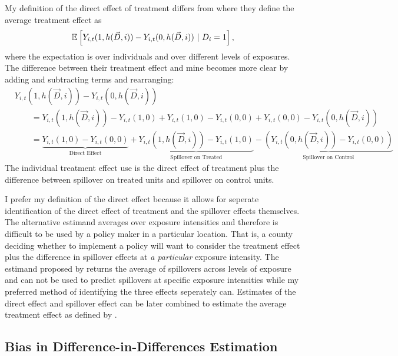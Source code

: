 \documentclass[11pt]{article}
\begin{document}
My definition of the direct effect of treatment differs from \citet{Sävje_Aronow_Hudgens_2019} where they define the average treatment effect as \[ 
    \mathbb{E}\left[Y_{i,t}(1, h(\vec{D}, i)) - Y_{i,t}(0, h(\vec{D}, i)) \ \vert \ D_i = 1\right],
\] 
where the expectation is over individuals and over different levels of exposures. The difference between their treatment effect and mine becomes more clear by adding and subtracting terms and rearranging:
\begin{align*}
    &Y_{i,t}(1, h(\vec{D}, i)) - Y_{i,t}(0, h(\vec{D}, i)) \\
    &\quad\quad = Y_{i,t}(1, h(\vec{D}, i)) - Y_{i,t}(1, 0) + Y_{i,t}(1, 0) - Y_{i,t}(0,0) + Y_{i,t}(0,0) - Y_{i,t}(0, h(\vec{D}, i)) \\
    &\quad\quad = \underbrace{Y_{i,t}(1, 0) - Y_{i,t}(0,0)}_{\text{Direct Effect}} + \underbrace{Y_{i,t}(1, h(\vec{D}, i)) - Y_{i,t}(1, 0)}_{\text{Spillover on Treated}} - \underbrace{(Y_{i,t}(0, h(\vec{D}, i)) - Y_{i,t}(0,0))}_{\text{Spillover on Control}} 
\end{align*}
The individual treatment effect \citet{Sävje_Aronow_Hudgens_2019} use is the direct effect of treatment plus the difference between spillover on treated units and spillover on control units. 

I prefer my definition of the direct effect because it allows for seperate identification of the direct effect of treatment and the spillover effects themselves. The alternative estimand averages over exposure intensities and therefore is difficult to be used by a policy maker in a particular location. That is, a county deciding whether to implement a policy will want to consider the treatment effect plus the difference in spillover effects at \textit{a particular} exposure intensity. The estimand proposed by \citet{Sävje_Aronow_Hudgens_2019} returns the average of spillovers across levels of exposure and can not be used to predict spillovers at specific exposure intensities while my preferred method of identifying the three effects seperately can. Estimates of the direct effect and spillover effect can be later combined to estimate the average treatment effect as defined by \citet{Sävje_Aronow_Hudgens_2019}.




\subsection{Bias in Difference-in-Differences Estimation}
\end{document}
